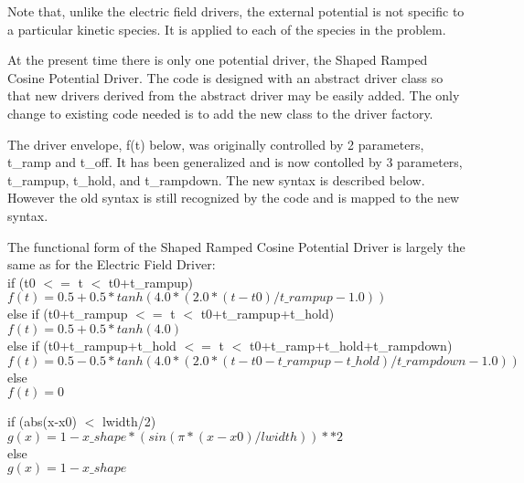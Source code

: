 \documentclass[11pt]{amsart}
\begin{document}
Note that, unlike the electric field drivers, the external potential is not
specific to a particular kinetic species.  It is applied to each of the
species in the problem.

At the present time there is only one potential driver, the Shaped Ramped
Cosine Potential Driver.  The code is designed with an abstract driver class so
that new drivers derived from the abstract driver may be easily added.  The
only change to existing code needed is to add the new class to the driver
factory.

The driver envelope, f(t) below, was originally controlled by 2 parameters,
t\_ramp and t\_off.  It has been generalized and is now contolled by 3
parameters, t\_rampup, t\_hold, and t\_rampdown.  The new syntax is described
below.  However the old syntax is still recognized by the code and is mapped to
the new syntax.

The functional form of the Shaped Ramped Cosine Potential Driver is largely
the same as for the Electric Field Driver: \\
\noindent if (t0 $<=$ t $<$ t0+t\_rampup) \\
\indent \begin{math} f(t) = 0.5+0.5*tanh(4.0*(2.0*(t-t0)/t\_rampup-1.0)) \end{math} \\
else if (t0+t\_rampup $<=$ t $<$ t0+t\_rampup+t\_hold) \\
\indent \begin{math}f(t) = 0.5+0.5*tanh(4.0) \end{math} \\
else if (t0+t\_rampup+t\_hold $<=$ t $<$ t0+t\_ramp+t\_hold+t\_rampdown) \\
\indent \begin{math} f(t) = 0.5-0.5*tanh(4.0*(2.0*(t-t0-t\_rampup-t\_hold)/t\_rampdown-1.0)) \end{math} \\
else \\
\indent \begin{math} f(t) = 0 \end{math}

\noindent if (abs(x-x0) $<$ lwidth/2) \\
\indent \begin{math} g(x) = 1-x\_shape*(sin(\pi*(x-x0)/lwidth))**2 \end{math} \\
else \\
\indent \begin{math} g(x) = 1-x\_shape \end{math}
\end{document}
